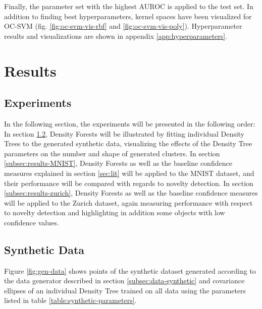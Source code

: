 \documentclass[10pt]{article}
\begin{document}
Finally, the parameter set with the highest \gls{AUROC} is applied to the test set. In addition to finding best hyperparameters, kernel spaces have been visualized for \gls{OC-SVM}  (fig. \ref{fig:oc-svm-vis-rbf} and \ref{fig:oc-svm-vis-poly}). Hyperparameter results and visualizations are shown in appendix \ref{app:hyperparameters}.


\section{Results}

\subsection{Experiments}
In the following section, the experiments will be presented in the following order: In section \ref{subsec:results-synthetic}, Density Forests will be illustrated by fitting individual Density Trees to the generated synthetic data, visualizing the effects of the Density Tree parameters on the number and shape of generated clusters. In section \ref{subsec:results-MNIST}, Density Forests as well as the baseline confidence measures explained in section \ref{sec:lit} will be applied to the MNIST dataset, and their performance will be compared with regards to novelty detection. In section \ref{subsec:results-zurich}, Density Forests as well as the baseline confidence measures will be applied to the Zurich dataset, again measuring performance with respect to novelty detection and highlighting in addition some objects with low confidence values.

\subsection{Synthetic Data}
\label{subsec:results-synthetic}


Figure \ref{fig:gen-data} shows points of the synthetic dataset generated according to the data generator described in section \ref{subsec:data-synthetic} and covariance ellipses of an individual Density Tree trained on all data using the parameters listed in table \ref{table:synthetic-parameters}.
\end{document}
